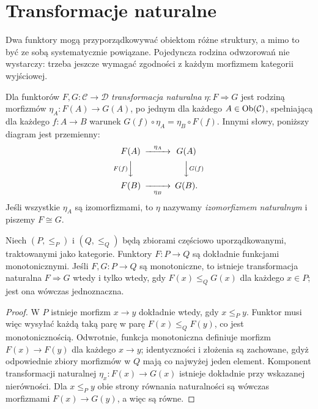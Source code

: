 \section{Transformacje naturalne}\label{sec:naturalne}

Dwa funktory mogą przyporządkowywać obiektom różne struktury, a mimo to być ze sobą systematycznie powiązane. Pojedyncza rodzina odwzorowań nie wystarczy: trzeba jeszcze wymagać zgodności z każdym morfizmem kategorii wyjściowej.

\begin{definicja}\label{def:naturalna}
Dla funktorów $F,G:\mathcal C\to\mathcal D$ \emph{transformacja naturalna} $\eta:F\Rightarrow G$ jest rodziną morfizmów $\eta_A:F(A)\to G(A)$, po jednym dla każdego $A\in\operatorname{Ob}(\mathcal C)$, spełniającą dla każdego $f:A\to B$ warunek $G(f)\circ\eta_A=\eta_B\circ F(f)$. Innymi słowy, poniższy diagram jest przemienny:
\[
\begin{CD}
F(A) @>{\eta_A}>> G(A)\\
@V{F(f)}VV @VV{G(f)}V\\
F(B) @>>{\eta_B}> G(B).
\end{CD}
\]
Jeśli wszystkie $\eta_A$ są izomorfizmami, to $\eta$ nazywamy \emph{izomorfizmem naturalnym} i piszemy $F\cong G$.
\end{definicja}

\begin{stwierdzenie}\label{tw:fun-posety}
Niech $(P,\le_P)$ i $(Q,\le_Q)$ będą zbiorami częściowo uporządkowanymi, traktowanymi jako kategorie. Funktory $F:P\to Q$ są dokładnie funkcjami monotonicznymi. Jeśli $F,G:P\to Q$ są monotoniczne, to istnieje transformacja naturalna $F\Rightarrow G$ wtedy i tylko wtedy, gdy $F(x)\le_Q G(x)$ dla każdego $x\in P$; jest ona wówczas jednoznaczna.
\end{stwierdzenie}
\begin{proof}
W $P$ istnieje morfizm $x\to y$ dokładnie wtedy, gdy $x\le_P y$. Funktor musi więc wysyłać każdą taką parę w parę $F(x)\le_Q F(y)$, co jest monotonicznością. Odwrotnie, funkcja monotoniczna definiuje morfizm $F(x)\to F(y)$ dla każdego $x\to y$; identyczności i złożenia są zachowane, gdyż odpowiednie zbiory morfizmów w $Q$ mają co najwyżej jeden element. Komponent transformacji naturalnej $\eta_x:F(x)\to G(x)$ istnieje dokładnie przy wskazanej nierówności. Dla $x\le_P y$ obie strony równania naturalności są wówczas morfizmami $F(x)\to G(y)$, a więc są równe.
\end{proof}

